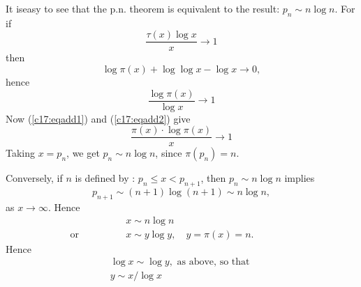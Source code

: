 It is\pageoriginale easy to see that the p.n. theorem is equivalent to the result:
$p_n \sim n \log n$. For if 
\begin{equation*}
 \frac{\tau(x) \log x}{x}  \to 1\tag{1}\label{c17:eqadd1}
\end{equation*}
then 
$$
\log \pi (x) + \log \log x - \log x \to 0,
$$
hence
\begin{equation*}
 \frac{\log \pi (x)}{\log x} \to 1\tag{2}\label{c17:eqadd2}
\end{equation*}
Now (\ref{c17:eqadd1}) and (\ref{c17:eqadd2}) give 
$$
\frac{\pi (x) \cdot \log \pi (x)}{x} \to 1
$$
Taking $x =p_n$, we get $p_n \sim n \log n $, since $\pi(p_n) = n$. 

Conversely, if $n$ is defined by : $p_n \leq x < p_{n+1}$, then $p_n
\sim n \log n $ implies
$$
p_{n+1} \sim (n+1) \log (n+1) \sim n \log n, 
$$
as $x \to \infty$. Hence
\begin{align*}
& x \sim n \log n \\
\text{or} \qquad \qquad  & x \sim y \log y, \quad y = \pi (x) =
n. \qquad \qquad  
\end{align*}
Hence
\begin{gather*}
\log x \sim \log y, \text{ as above,  so that }\\
y  \sim x / \log x
\end{gather*}


